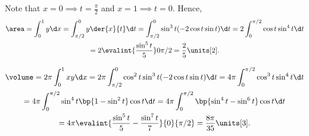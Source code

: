 \begin{solution}
\begin{ppart}
\begin{center}
        \end{center}
    \end{ppart}
    \begin{ppart}
        Note that $x = 0 \implies t = \frac\pi2$ and $x = 1 \implies t = 0$. Hence,
        \begin{gather*}
            \area = \int_0^1 y \d x = \int_{\pi/2}^0 y \der{x}{t} \d t = \int_{\pi/2}^0 \sin^3 t (-2\cos t \sin t) \d t = 2\int_0^{\pi/2} \cos t \sin^4 t \d t\\
            = 2\evalint{\frac{\sin^5 t}{5}}0{\pi/2} = \frac25 \units[2].
        \end{gather*}
    \end{ppart}
    \begin{ppart}
        \begin{gather*}
            \volume = 2\pi \int_0^1 xy \d x = 2\pi \int_{\pi/2}^0 \cos^2 t \sin^3 t (-2\cos t \sin t) \d t 
            = 4\pi \int_0^{\pi/2} \cos^3 t \sin^4 t \d t\\
            = 4\pi \int_0^{\pi/2} \sin^4 t \bp{1 - \sin^2 t} \cos t \d t = 4\pi \int_0^{\pi/2} \bp{\sin^4 t - \sin^6 t} \cos t \d t \\
            = 4\pi \evalint{\frac{\sin^5 t}{5} - \frac{\sin^7 t}{7}}{0}{\pi/2} = \frac{8\pi}{35} \units[3].
        \end{gather*}
    \end{ppart}
\end{solution}

